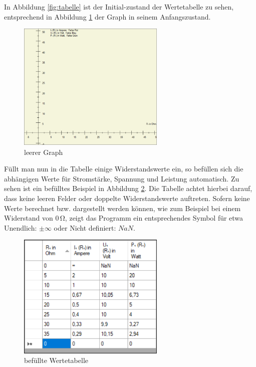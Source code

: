 \documentclass[a4paper]{article}
\begin{document}
    In Abbildung \ref{fig:tabelle} ist der Initial-zustand der Wertetabelle zu sehen, entsprechend in Abbildung \ref{fig:graph} der Graph in seinem Anfangszustand.
    \begin{figure}[!h]
        \begin{center}
            \includegraphics[width=7cm]{img/graph}
            \caption{leerer Graph}
            \label{fig:graph}
        \end{center}
    \end{figure}

    Füllt man nun in die Tabelle einige Widerstandswerte ein, so befüllen sich die abhängigen Werte für Stromstärke, Spannung und Leistung automatisch.
    Zu sehen ist ein befülltes Beispiel in Abbildung \ref{fig:tabellebefuellt}.
    Die Tabelle achtet hierbei darauf, dass keine leeren Felder oder doppelte Widerstandswerte auftreten.
    Sofern keine Werte berechnet bzw. dargestellt werden können, wie zum Beispiel bei einem Widerstand von $0\,\si{\ohm}$, zeigt das Programm ein entsprechendes Symbol für etwa \glqq Unendlich\grqq{}: $\pm\infty$ oder \glqq Nicht definiert\grqq{}: $NaN$.
    \begin{figure}[!h]
        \begin{center}
            \includegraphics[width=7cm]{img/tabellebefuellt}
            \caption{befüllte Wertetabelle}
            \label{fig:tabellebefuellt}
        \end{center}
    \end{figure}
\end{document}

